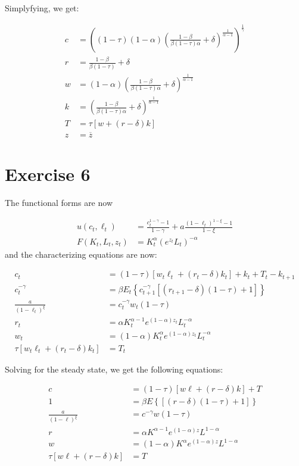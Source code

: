 \documentclass[11pt]{article}
\numberwithin{equation}{section}
\theoremstyle{plain}
\theoremstyle{definition}
\newcommand\parens[1]{\left( #1 \right)}
\newcommand{\1}{\mathbbm 1}
\def\a{\alpha}
\def\b{\beta}
\def\g{\gamma}
\def\d{\delta}
\def\t{\tau}
\begin{document}
Simplyfying, we get:

\begin{align}
c&= \parens{(1 - \t)(1-\a) \parens{\frac{1-\b}{\b (1 - \t) \a} + \d}^{\frac{1}{\a - 1}}}^{\frac{1}{\g}} \\
r&= \frac{1-\b}{\b (1 - \t)} + \d \\
w&=(1-\a)\parens{\frac{1-\b}{\b (1 - \t) \a} + \d}^{\frac{1}{\a - 1}} \\
k&=\parens{\frac{1-\b}{\b (1 - \t) \a} + \d}^{\frac{1}{\a - 1}} \\
T &=\tau\left[w+\left(r-\delta\right) k\right]\\
z&=\overline{z}
\end{align}

\section{Exercise 6}

The functional forms are now 

\begin{align} 
 u\left(c_{t}, \ell_{t}\right) &=\frac{c_{t}^{1-\gamma}-1}{1-\gamma}+a \frac{\left(1-\ell_{t}\right)^{1-\xi}-1}{1-\xi} \\ 
  F\left(K_{t}, L_{t}, z_{t}\right) &= K_{t}^{\alpha} \parens{e^{z_{t}} L_{t}}^{-\alpha} 
 \end{align}
and the characterizing equations are now:

\begin{align}
c_{t}&=(1-\tau)\left[w_{t} \ell_{t}+\left(r_{t}-\delta\right) k_{t}\right]+k_{t}+T_{t}-k_{t+1} \\
c_t^{-\g}&=\beta E_{t}\left\{c_{t+1}^{-\g}\left[\left(r_{t+1}-\delta\right)(1-\tau)+1\right]\right\} \\
\frac{a}{(1-\ell_t)^{\xi}}&=c_t^{-\g} w_{t}(1-\tau) \\
r_{t}&=\a K_{t}^{\alpha - 1} e^{(1-\alpha)z_{t}}L_t^{-\a}\\
w_{t}&=(1-\a)K_{t}^{\alpha} e^{(1- \alpha) z_{t}}L_t^{-\a} \\
\tau\left[w_{t} \ell_{t}+\left(r_{t}-\delta\right) k_{t}\right]&=T_t
\end{align}

Solving for the steady state, we get the following equations:

\begin{align}
c&=(1-\tau)\left[w \ell+\left(r-\delta\right) k\right]+T \\
1&=\beta E\left\{\left[\left(r-\delta\right)(1-\tau)+1\right]\right\} \\
\frac{a}{(1-\ell)^{\xi}}&=c^{-\g} w(1-\tau) \\
r&=\a K^{\alpha - 1} e^{(1-\alpha)z}L^{1-\a}\\
w&=(1-\a)K^{\alpha} e^{(1- \alpha) z}L^{1-\a} \\
\tau\left[w \ell+\left(r-\delta\right) k\right]&=T
\end{align}
\end{document}
